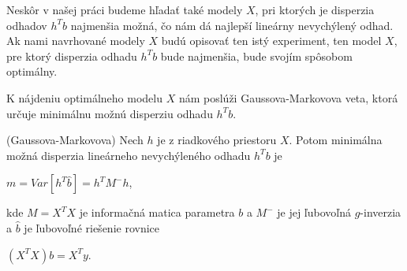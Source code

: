 Neskôr v našej práci budeme hľadať také modely $X$, pri ktorých je disperzia odhadov $h^T b$ najmenšia možná,
čo nám dá najlepší lineárny nevychýlený odhad. 
Ak nami navrhované modely $X$ budú opisovať ten istý experiment, ten model $X$,
pre ktorý disperzia odhadu $h^T b$ bude najmenšia, bude svojím spôsobom optimálny.

K nájdeniu optimálneho modelu $X$ nám poslúži Gaussova-Markovova veta, 
ktorá určuje minimálnu možnú disperziu odhadu $h^T b$.

\begin{theorem}
\label{gauss-markov}
(Gaussova-Markovova) Nech $h$ je z riadkového priestoru $X$. 
Potom minimálna možná disperzia lineárneho nevychýleného odhadu $h^T b$ je

\begin{center}
$
m = Var[h^T \hat{b}] = h^T M^- h
$,
\end{center}

kde $M = X^T X$ je informačná matica parametra $b$ a $M^-$ je jej ľubovoľná $g$-inverzia
a $\hat{b}$ je ľubovoľné riešenie rovnice

\begin{center}
$
(X^T X)b = X^T y
$.
\end{center}
\end{theorem}